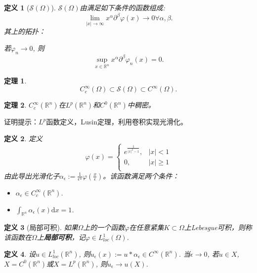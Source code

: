 \documentclass[a4paper]{ctexart}
\newtheorem{Definition}{\hspace{2em}定义}[section]
\newtheorem{Thm}{\hspace{2em}定理}[section]
\newcommand{\dif}{\mathrm{d}}
\begin{document}
\begin{Definition}[$\mathscr{S}(\Omega)$]
    $\mathscr{S}(\Omega)$由满足如下条件的函数组成:
    \begin{equation}
        \lim_{|x|\rightarrow\infty}x^{\alpha}\partial^{\beta}\varphi(x)\rightarrow 0\forall\alpha,\beta.
    \end{equation}    
    其上的拓扑：

    若$\varphi_{n}\rightarrow 0$, 则
    \begin{equation}
        \sup_{x\in\mathbb{R}^{n}}x^{\alpha}\partial^{\beta}\varphi_{n}(x)=0.
    \end{equation}
\end{Definition}
\begin{Thm}
    \begin{equation}
        C_{c}^{\infty}(\Omega)\subset\mathscr{S}(\Omega)\subset C^{\infty}(\Omega).
    \end{equation}
\end{Thm}
\begin{Thm}
    $C_{c}^{\infty}(\mathbb{R}^{n})$在$L^{p}(\mathbb{R}^{n})$和$C^{0}(\mathbb{R}^{n})$中稠密。
\end{Thm}
证明提示：$L^{p}$函数定义，Lusin定理，利用卷积实现光滑化。
\begin{Definition}
    定义
    \begin{equation}
        \varphi(x)=
        \left\{
            \begin{aligned}
            e^{\frac{1}{|x|^{2}-1}},&|x|<1\\
            0,&|x|\ge1\\
            \end{aligned}
        \right.
    \end{equation}
    由此导出光滑化子$\alpha_{\epsilon}:=\frac{1}{\epsilon^{n}}\varphi(\frac{x}{\epsilon})$。该函数满足两个条件：
    \begin{itemize}
        \item $\alpha_{\epsilon}\in C_{c}^{\infty}(\mathbb{R}^{n})$.
        \item $\int_{\mathbb{R}^{n}}\alpha_{\epsilon}(x)\dif x=1$.
    \end{itemize}
\end{Definition}
\begin{Definition}[局部可积]
    如果$\Omega$上的一个函数$\varphi$在任意紧集$K\subset\Omega$上Lebesgue可积，则称该函数在$\Omega$上\textbf{局部可积}，记$\varphi\in L_{loc}^{1}(\Omega)$.
\end{Definition}
\begin{Definition}
    设$u\in L_{loc}^{1}(\mathbb{R}^{n})$, 则$u_{\epsilon}(x):=u*\alpha_{\epsilon}\in C^{\infty}(\mathbb{R}^{n})$. 当$\epsilon\rightarrow 0$, 若$u\in X$, $X=C^{0}(\mathbb{R}^{n})$或$X=L^{p}(\mathbb{R}^{n})$, 则$u_{\epsilon}\rightarrow u(X)$.
\end{Definition}
\end{document}
